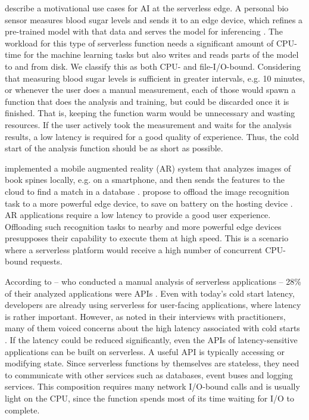 \begin{description}[style=multiline, leftmargin=2.5cm, font=\bfseries]
    \item[Edge AI] \citeauthor{Rausch2019} describe a motivational use cases for AI at the serverless edge. A personal bio sensor measures blood sugar levels and sends it to an edge device, which refines a pre-trained model with that data and serves the model for inferencing \cite{Rausch2019}. The workload for this type of serverless function needs a significant amount of CPU-time for the machine learning tasks but also writes and reads parts of the model to and from disk. We classify this as both CPU- and file-I/O-bound. Considering that measuring blood sugar levels is sufficient in greater intervals, e.g. 10 minutes, or whenever the user does a manual measurement, each of those would spawn a function that does the analysis and training, but could be discarded once it is finished. That is, keeping the function warm would be unnecessary and wasting resources. If the user actively took the measurement and waits for the analysis results, a low latency is required for a good quality of experience. Thus, the cold start of the analysis function should be as short as possible.
    
    \item[Augmented Reality] \citeauthor{Huang2012} implemented a mobile augmented reality (AR) system that analyzes images of book spines locally, e.g. on a smartphone, and then sends the features to the cloud to find a match in a database \cite{Huang2012}. \citeauthor{Baresi2019} propose to offload the image recognition task to a more powerful edge device, to save on battery on the hosting device \cite{Baresi2019}. AR applications require a low latency to provide a good user experience. Offloading such recognition tasks to nearby and more powerful edge devices presupposes their capability to execute them at high speed. This is a scenario where a serverless platform would receive a high number of concurrent CPU-bound requests.

    \item[APIs] According to \citeauthor{Eismann2021a} -- who conducted a manual analysis of serverless applications -- 28\% of their analyzed applications were APIs \cite{Eismann2021a}. Even with today's cold start latency, developers are already using serverless for user-facing applications, where latency is rather important. However, as \citeauthor{Leitner2019} noted in their interviews with practitioners, many of them voiced concerns about the high latency associated with cold starts \cite{Leitner2019}. If the latency could be reduced significantly, even the APIs of latency-sensitive applications can be built on serverless. A useful API is typically accessing or modifying state. Since serverless functions by themselves are stateless, they need to communicate with other services such as databases, event buses and logging services. This composition requires many network I/O-bound calls and is usually light on the CPU, since the function spends most of its time waiting for I/O to complete.

\end{description}

